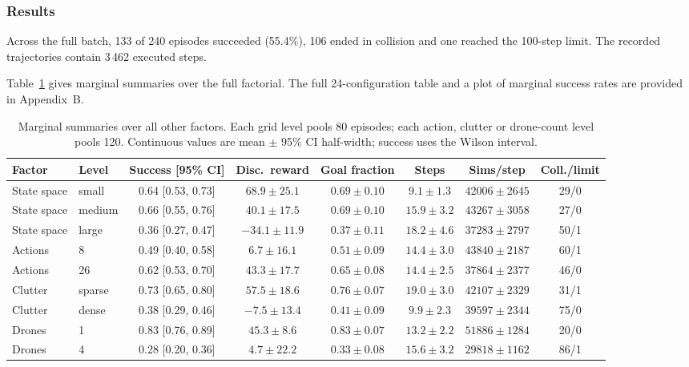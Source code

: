 \documentclass[11pt,a4paper]{article}
\begin{document}
\subsubsection*{Results}
Across the full batch, 133 of 240 episodes succeeded (55.4\%), 106 ended in collision and one reached the 100-step limit. The recorded trajectories contain 3\,462 executed steps.

Table~\ref{tab:b4-marginal} gives marginal summaries over the full factorial. The full 24-configuration table and a plot of marginal success rates are provided in Appendix~B.

\begin{table}[H]
\centering
\scriptsize
\setlength{\tabcolsep}{3.2pt}
\begin{tabular}{llcccccc}
\toprule
Factor & Level & Success [95\% CI] & Disc.\ reward & Goal fraction & Steps & Sims/step & Coll./limit \\
\midrule
State space & small & 0.64 [0.53, 0.73] & $68.9 \pm 25.1$ & $0.69 \pm 0.10$ & $9.1 \pm 1.3$ & $42006 \pm 2645$ & 29/0 \\
State space & medium & 0.66 [0.55, 0.76] & $40.1 \pm 17.5$ & $0.69 \pm 0.10$ & $15.9 \pm 3.2$ & $43267 \pm 3058$ & 27/0 \\
State space & large & 0.36 [0.27, 0.47] & $-34.1 \pm 11.9$ & $0.37 \pm 0.11$ & $18.2 \pm 4.6$ & $37283 \pm 2797$ & 50/1 \\
\midrule
Actions & 8 & 0.49 [0.40, 0.58] & $6.7 \pm 16.1$ & $0.51 \pm 0.09$ & $14.4 \pm 3.0$ & $43840 \pm 2187$ & 60/1 \\
Actions & 26 & 0.62 [0.53, 0.70] & $43.3 \pm 17.7$ & $0.65 \pm 0.08$ & $14.4 \pm 2.5$ & $37864 \pm 2377$ & 46/0 \\
\midrule
Clutter & sparse & 0.73 [0.65, 0.80] & $57.5 \pm 18.6$ & $0.76 \pm 0.07$ & $19.0 \pm 3.0$ & $42107 \pm 2329$ & 31/1 \\
Clutter & dense & 0.38 [0.29, 0.46] & $-7.5 \pm 13.4$ & $0.41 \pm 0.09$ & $9.9 \pm 2.3$ & $39597 \pm 2344$ & 75/0 \\
\midrule
Drones & 1 & 0.83 [0.76, 0.89] & $45.3 \pm 8.6$ & $0.83 \pm 0.07$ & $13.2 \pm 2.2$ & $51886 \pm 1284$ & 20/0 \\
Drones & 4 & 0.28 [0.20, 0.36] & $4.7 \pm 22.2$ & $0.33 \pm 0.08$ & $15.6 \pm 3.2$ & $29818 \pm 1162$ & 86/1 \\
\bottomrule
\end{tabular}
\caption{Marginal summaries over all other factors. Each grid level pools 80 episodes; each action, clutter or drone-count level pools 120. Continuous values are mean $\pm$ 95\% CI half-width; success uses the Wilson interval.}
\label{tab:b4-marginal}
\end{table}
\end{document}
